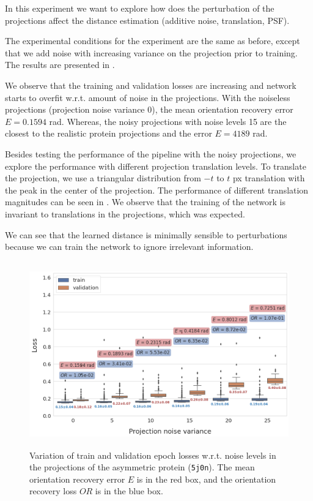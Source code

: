 In this experiment we want to explore how does the perturbation of the projections affect the distance estimation (additive noise, translation, PSF).

The experimental conditions for the experiment are the same as before, except that we add noise with increasing variance on the projection prior to training.
The results are presented in .

We observe that the training and validation losses are increasing and network starts to overfit w.r.t. amount of noise in the projections.
With the noiseless projections (projection noise variance 0), the mean orientation recovery error $E = 0.1594$ rad.
Whereas, the noisy projections with noise levels 15 are the closest to the realistic protein projections and the error $E=4189$ rad.

Besides testing the performance of the pipeline with the noisy projections, we explore the performance with different projection translation levels.
To translate the projection, we use a triangular distribution from $-t$ to $t$ px translation with the peak in the center of the projection.
The performance of different translation magnitudes can be seen in .
We observe that the training of the network is invariant to translations in the projections, which was expected.

We can see that the learned distance is minimally sensible to perturbations because we can train the network to ignore irrelevant information.

\begin{figure}[ht!]
    \centering
        \includegraphics[height=8cm]{images/de_noises_nums.png}
        \caption{%
            Variation of train and validation epoch losses w.r.t. noise levels in the projections of the asymmetric protein (\texttt{5j0n}). The mean orientation recovery error $E$ is in the red box, and the orientation recovery loss $OR$ is in the blue box.
        }\label{fig:distance-estimation-vary-projection-noise}
\end{figure}

